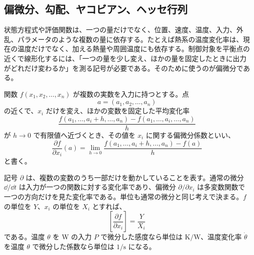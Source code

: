 \subsection{偏微分、勾配、ヤコビアン、ヘッセ行列}

状態方程式や評価関数は、一つの量だけでなく、位置、速度、温度、入力、外乱、パラメータのような複数の量に依存する。たとえば熱系の温度変化率は、現在の温度だけでなく、加える熱量や周囲温度にも依存する。制御対象を平衡点の近くで線形化するには、「一つの量を少し変え、ほかの量を固定したときに出力がどれだけ変わるか」を測る記号が必要である。そのために使うのが偏微分である。

\begin{definition}[偏微分]
関数 $f(x_1,x_2,\ldots,x_n)$ が複数の実数を入力に持つとする。点
\begin{equation}
  a=(a_1,a_2,\ldots,a_n)
\end{equation}
の近くで、$x_i$ だけを変え、ほかの変数を固定した平均変化率
\begin{equation}
  \frac{
    f(a_1,\ldots,a_i+h,\ldots,a_n)
    -f(a_1,\ldots,a_i,\ldots,a_n)
  }{h}
\end{equation}
が $h\to0$ で有限値へ近づくとき、その値を $x_i$ に関する偏微分係数といい、
\begin{equation}
  \frac{\partial f}{\partial x_i}(a)
  =
  \lim_{h\to0}
  \frac{
    f(a_1,\ldots,a_i+h,\ldots,a_n)-f(a)
  }{h}
\end{equation}
と書く。
\end{definition}

記号 $\partial$ は、複数の変数のうち一部だけを動かしていることを表す。通常の微分 $\dd/\dd t$ は入力が一つの関数に対する変化率であり、偏微分 $\partial/\partial x_i$ は多変数関数で一つの方向だけを見た変化率である。単位も通常の微分と同じ考えで決まる。$f$ の単位を $Y$、$x_i$ の単位を $X_i$ とすれば、
\begin{equation}
  \left[\frac{\partial f}{\partial x_i}\right]
  =
  \frac{Y}{X_i}
\end{equation}
である。温度 $\theta$ を W の入力 $P$ で微分した感度なら単位は $\mathrm{K/W}$、温度変化率 $\dot{\theta}$ を温度 $\theta$ で微分した係数なら単位は $1/\mathrm{s}$ になる。

